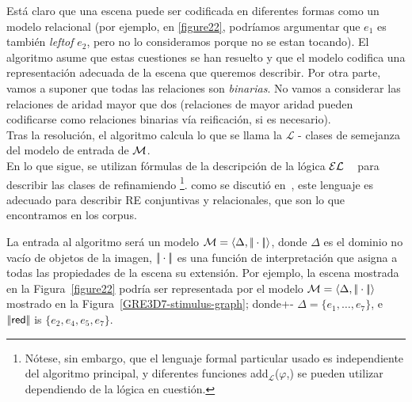 Est\'a claro que una escena puede ser codificada en diferentes formas como un
modelo relacional (por ejemplo, en \ref{figure22}, podr\'{i}amos argumentar que
$e_1$ es tambi\'en \emph{leftof} $e_2$, pero no lo consideramos porque no se estan 
tocando). El algoritmo asume que estas cuestiones se han resuelto y que el modelo codifica una representaci\'on adecuada de la escena que
queremos describir. Por otra parte, vamos a suponer que todas las relaciones son
\emph{binarias}. No vamos a considerar las relaciones de aridad mayor que
dos (relaciones de mayor aridad pueden codificarse como relaciones binarias v\'{i}a
reificaci\'on, si es necesario).\\



Tras la resoluci\'on, el algoritmo calcula lo que se llama la
$\mathcal{L}$ - clases de semejanza del modelo de entrada de $\mathcal{M}$.\\


En lo que sigue, se utilizan f\'ormulas de la descripci\'on de la l\'ogica $\mathcal{EL}$
~\cite{baad:desc03} para describir las clases de refinamiendo
\footnote{N\'otese, sin embargo, que el lenguaje formal particular usado es
   independiente del algoritmo principal, y diferentes funciones
  add$_{\mathcal{L}}$($\varphi$,\RE) se pueden utilizar dependiendo
   de la l\'ogica en cuesti\'on.}. como se discuti\'o 
en~\cite{arec2:2008:Areces}, 
este lenguaje es adecuado para describir
RE conjuntivas y relacionales, que son lo que encontramos en los corpus.

  La entrada al algoritmo ser\'a un modelo $\mathcal{M} =
 \langle \Delta, |\!|\cdot|\!| \rangle$, donde $\Delta$ es el dominio no vac\'io de objetos de la imagen,
 $|\!|\cdot|\!|$ es una funci\'on de interpretaci\'on que asigna a todas las propiedades de la escena su extensi\'on.
 Por ejemplo, la escena mostrada en la Figura~\ref{figure22} podr\'ia ser representada por el modelo
 $\mathcal{M}=\langle \Delta,|\!|\cdot|\!| \rangle$ mostrado en la 
 Figura~\ref{GRE3D7-stimulus-graph}; donde+- $\Delta =
 \{e_1,\ldots,e_7\}$, e $|\!|\textsf{red}|\!|$ is $\{e_2, e_4, e_5,
 e_7\}$.

